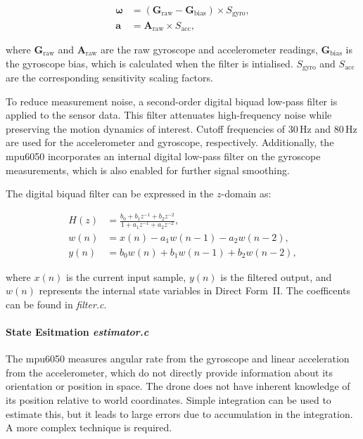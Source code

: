 \begin{align}
\boldsymbol{\omega} &= (\mathbf{G}_{\text{raw}} - \mathbf{G}_{\text{bias}}) \times S_{\text{gyro}}, \\[6pt]
\mathbf{a} &= \mathbf{A}_{\text{raw}} \times S_{\text{acc}},
\end{align}

where \( \mathbf{G}_{\text{raw}} \) and \( \mathbf{A}_{\text{raw}} \) are the raw gyroscope and accelerometer readings, 
\( \mathbf{G}_{\text{bias}} \) is the gyroscope bias, which is calculated when the filter is intialised. \( S_{\text{gyro}} \) and \( S_{\text{acc}} \) are the corresponding sensitivity scaling factors.

To reduce measurement noise, a second-order digital biquad low-pass filter is applied to the sensor data. This filter attenuates high-frequency noise while preserving the motion dynamics of interest. Cutoff frequencies of 30\,Hz and 80\,Hz are used for the accelerometer and gyroscope, respectively. Additionally, the \gls{mpu6050} incorporates an internal digital low-pass filter on the gyroscope measurements, which is also enabled for further signal smoothing.

The digital biquad filter can be expressed in the $z$-domain as:

\begin{align}
H(z) &= \frac{b_0 + b_1 z^{-1} + b_2 z^{-2}}{1 + a_1 z^{-1} + a_2 z^{-2}}, \\[6pt]
w(n) &= x(n) - a_1 w(n-1) - a_2 w(n-2), \\[6pt]
y(n) &= b_0 w(n) + b_1 w(n-1) + b_2 w(n-2),
\end{align}

where \( x(n) \) is the current input sample, \( y(n) \) is the filtered output, and \( w(n) \) represents the internal state variables in Direct Form~II. The coefficents can be found in \textit{filter.c}.

\paragraph{\textbf{State Esitmation} \textit{estimator.c}} \leavevmode 

The \gls{mpu6050} measures angular rate from the gyroscope and linear acceleration from the accelerometer, which do not directly provide information about its orientation or position in space. The drone does not have inherent knowledge of its position relative to world coordinates. Simple integration can be used to estimate this, but it leads to large errors due to accumulation in the integration. A more complex technique is required.


